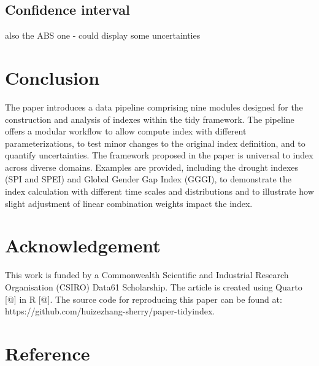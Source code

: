 \documentclass[
]{interact}
\begin{document}
\hypertarget{confidence-interval}{%
\subsection{Confidence interval}\label{confidence-interval}}

also the ABS one - could display some uncertainties

\hypertarget{conclusion}{%
\section{Conclusion}\label{conclusion}}

The paper introduces a data pipeline comprising nine modules designed
for the construction and analysis of indexes within the tidy framework.
The pipeline offers a modular workflow to allow compute index with
different parameterizations, to test minor changes to the original index
definition, and to quantify uncertainties. The framework proposed in the
paper is universal to index across diverse domains. Examples are
provided, including the drought indexes (SPI and SPEI) and Global Gender
Gap Index (GGGI), to demonstrate the index calculation with different
time scales and distributions and to illustrate how slight adjustment of
linear combination weights impact the index.

\hypertarget{acknowledgement}{%
\section{Acknowledgement}\label{acknowledgement}}

This work is funded by a Commonwealth Scientific and Industrial Research
Organisation (CSIRO) Data61 Scholarship. The article is created using
Quarto {[}@{]} in R {[}@{]}. The source code for reproducing this paper
can be found at: https://github.com/huizezhang-sherry/paper-tidyindex.

\hypertarget{reference}{%
\section*{Reference}\label{reference}}
\end{document}
